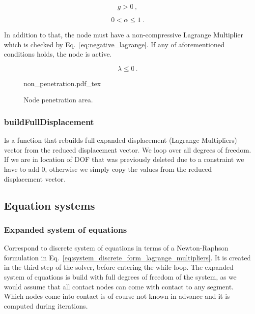 \documentclass[10pt,a4paper]{article}
\begin{document}
\begin{equation}
	g > 0  \:,
	\label{eq:within_penetration}
\end{equation}

\begin{equation}
	0 < \alpha \leq 1  \:.
	\label{eq:within_boundary}
\end{equation}

In addition to that, the node must have a non-compressive Lagrange Multiplier which is checked by Eq.~\eqref{eq:negative_lagrange}. If any of aforementioned conditions holds, the node is active.

\begin{equation}
	\lambda \leq 0 \:.
	\label{eq:negative_lagrange}
\end{equation}

\begin{figure}[ht]
	\centering
	\footnotesize
    \def\svgwidth{0.85\textwidth}{non_penetration.pdf_tex}
	\caption{Node penetration area.}
	\label{im:non_penetration}
\end{figure}

\subsubsection{buildFullDisplacement}

Is a function that rebuilds full expanded displacement (Lagrange Multipliers) vector from the reduced displacement vector. We loop over all degrees of freedom. If we are in location of DOF that was previously deleted due to a constraint we have to add 0, otherwise we simply copy the values from the reduced displacement vector.



\subsection{Equation systems}

\subsubsection{Expanded system of equations}

Correspond to discrete system of equations in terms of a Newton-Raphson formulation in Eq.~\eqref{eq:system_discrete_form_lagrange_multipliers}. It is created in the third step of the solver, before entering the while loop. The expanded system of equations is build with full degrees of freedom of the system, as we would assume that all contact nodes can come with contact to any segment. Which nodes come into contact is of course not known in advance and it is computed during iterations. \\
\end{document}
